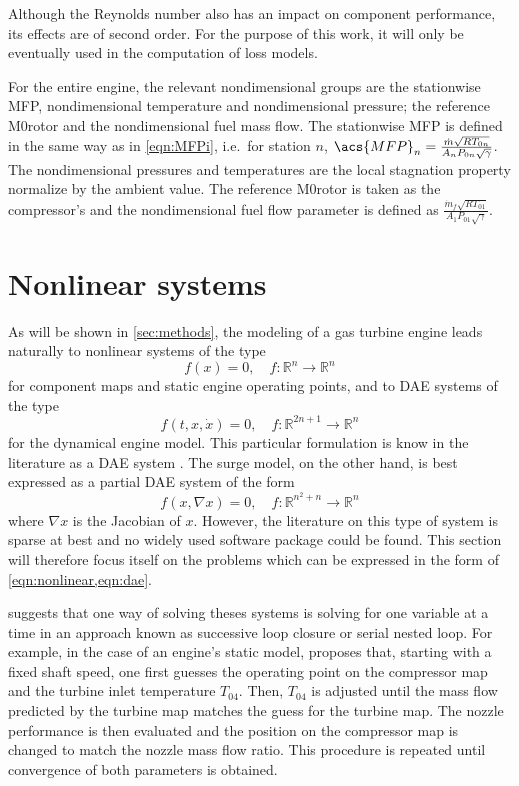 Although the Reynolds number also has an impact on component performance, 
its effects are of second order\cite{walsh2004gas}. 
For the purpose of this work, it will only be eventually used in the computation of loss models.

For the entire engine, the relevant nondimensional groups are the stationwise
\acl{MFP}, nondimensional temperature and nondimensional pressure;
the reference \acl{M0rotor} and the nondimensional fuel mass flow. 
The stationwise \acl{MFP} is defined in the same way as in \cref{eqn:MFPi}, 
i.e.\ for station $n$, $\acs{MFP}_n = \MFP{n}$. 
The nondimensional pressures and temperatures are the local stagnation property normalize by the ambient value. The reference \acl{M0rotor} is taken as the compressor's 
and the nondimensional fuel flow parameter is defined as 
$\frac{\dot{m}_f \sqrt{RT_{01}}}{A_1 P_{01} \sqrt{\gamma}}$.

\section{Nonlinear systems}
\label{sec:review:numeric}

As will be shown in \cref{sec:methods}, the modeling of a gas turbine engine leads naturally to nonlinear systems of the type 
\begin{equation}
    \label{eqn:nonlinear}
    f(x) = 0, \quad f:\mathbb{R}^n \rightarrow \mathbb{R}^n
\end{equation}
for component maps and static engine operating points, and to \acl{DAE} systems of the type
\begin{equation}
    \label{eqn:dae}
    f(t, x, \dot{x}) = 0, \quad f:\mathbb{R}^{2n+1} \rightarrow \mathbb{R}^n
\end{equation}
for the dynamical engine model. 
This particular formulation is know in the literature as a \ac{DAE} system \cite{Brenan1995}.
The surge model, on the other hand, is best expressed as a partial \acl{DAE} system of the form
\begin{equation}
    f(x, \nabla x) = 0, \quad f:\mathbb{R}^{n^2+n} \rightarrow \mathbb{R}^n
\end{equation}
where $\nabla x$ is the Jacobian of $x$. 
However, the literature on this type of system is sparse at best and no widely used software package could be found.
This section will therefore focus itself on the problems which can be expressed in the form of \cref{eqn:nonlinear,eqn:dae}.

\textcite{walsh2004gas} suggests that one way of solving theses systems is solving for one variable at a time in an approach known as successive loop closure or serial nested loop. 
For example, in the case of an engine's static model, \textcite{walsh2004gas} proposes that, starting with a fixed shaft speed, one first guesses the operating point on the compressor map and the turbine inlet temperature $T_{04}$. Then, $T_04$ is adjusted until the mass flow predicted by the turbine map matches the guess for the turbine map. The nozzle performance is then evaluated and the position on the compressor map is changed to match the nozzle mass flow ratio. This procedure is repeated until convergence of both parameters is obtained.

